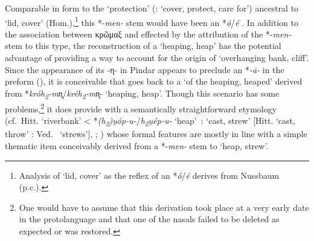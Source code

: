 \documentclass[output=paper,colorlinks,citecolor=brown]{langscibook}
\begin{document}
  Comparable in form to the  ‘protection’ (:  ‘cover, protect, care for’) ancestral to  ‘lid, cover’ (Hom.\+),\footnote{Analysis of  ‘lid, cover’ as the reflex of an *\textit{ó}/\textit{é}  derives from Nussbaum (p.c.).} this *-\textit{men-} stem would have been an *\textit{ó}/\textit{é} . In addition to the association between κρῶμαξ and  effected by the attribution of the *-\textit{men-} stem to this type, the reconstruction of a  ‘heaping, heap’ has the potential advantage of providing a way to account for the origin of  ‘overhanging bank, cliff’. Since the appearance of its -η- in Pindar appears to preclude an *\textit{-ā-} in the preform (), it is conceivable that  goes back to a   ‘of the heaping, heaped’ derived from  \mbox{*\textit{króh\textsubscript{2}-mn̥}/}\textit{kréh\textsubscript{2}-mn̥}- ‘heaping, heap’. Though this scenario has some problems,\footnote{One would have to assume that this derivation took place at a very early date in the protolanguage and that one of the nasals failed to be deleted as expected or was restored.} it does provide  with a semantically straightforward etymology (cf.\ Hitt.  ‘riverbank’ < \mbox{*\textit{(h\textsubscript{2})u̯óp-u-}/}\textit{h\textsubscript{2}u̯ép-u-}  \mbox{‘heap’ :}  ‘cast, strew’ [Hitt.  ‘cast, throw’ : Ved.\  ‘strews’], \citealt[125]{Catsanicos1985}; \citealt[176]{Melchert2013}) whose formal features are mostly in line with a simple thematic item conceivably derived from a *-\textit{men-} stem to  ‘heap, strew’.
\end{document}
